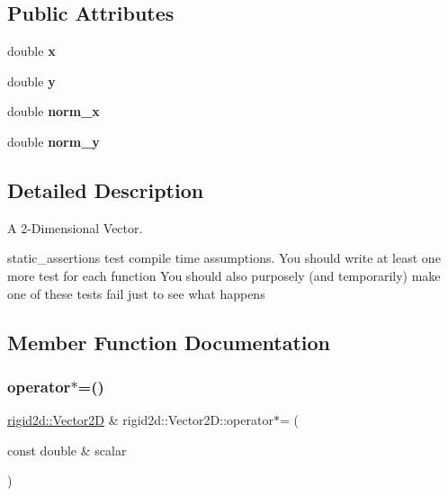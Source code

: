 \subsection*{Public Attributes}
\begin{DoxyCompactItemize}
\item 
\mbox{\label{structrigid2d_1_1Vector2D_a1876d655fe2da548c4813777c450845c}} 
double {\bfseries x}
\item 
\mbox{\label{structrigid2d_1_1Vector2D_aa814ea37ffe4a161b0020609580e4d17}} 
double {\bfseries y}
\item 
\mbox{\label{structrigid2d_1_1Vector2D_a187215ccee09402486afad8107592639}} 
double {\bfseries norm\+\_\+x}
\item 
\mbox{\label{structrigid2d_1_1Vector2D_ad4a3b1bc820490672c5a339e61ff8db2}} 
double {\bfseries norm\+\_\+y}
\end{DoxyCompactItemize}


\subsection{Detailed Description}
A 2-\/\+Dimensional Vector. 

static\+\_\+assertions test compile time assumptions. You should write at least one more test for each function You should also purposely (and temporarily) make one of these tests fail just to see what happens 

\subsection{Member Function Documentation}
\mbox{\label{structrigid2d_1_1Vector2D_a28ed19c24dd07b32695109c55fe95686}} 
\subsubsection{\texorpdfstring{operator$\ast$=()}{operator*=()}}
{\footnotesize\ttfamily \hyperlink{structrigid2d_1_1Vector2D}{rigid2d\+::\+Vector2D} \& rigid2d\+::\+Vector2\+D\+::operator$\ast$= (\begin{DoxyParamCaption}\item[{const double \&}]{scalar }\end{DoxyParamCaption})}



